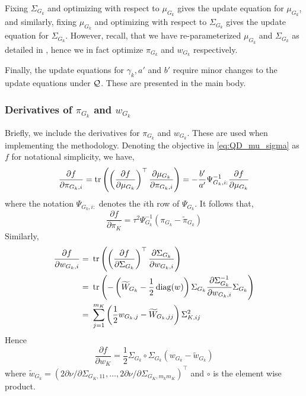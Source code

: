 Fixing $\Sigma_{G_k}$ and optimizing with respect to $\mu_{G_k}$ gives the update equation for $\mu_{G_k}$, and similarly, fixing $\mu_{G_k}$ and optimizing with respect to $\Sigma_{G_k}$ gives the update equation for $\Sigma_{G_k}$. However, recall, that we have re-parameterized $\mu_{G_k}$ and $\Sigma_{G_k}$ as detailed in , hence we in fact optimize $\pi_{G_k}$ and $w_{G_k}$ respectively.

Finally, the update equations for $\gamma_k, a'$ and $b'$ require minor changes to the update equations under $\mathcal{Q}$. These are presented in the main body.

\subsubsection{Derivatives of $\pi_{G_k}$ and $w_{G_k}$}

Briefly, we include the derivatives for $\pi_{G_k}$ and $w_{G_k}$. These are used when implementing the methodology. Denoting the objective in \eqref{eq:QD_mu_sigma} as $f$ for notational simplicity, we have,
\begin{equation*}
    \frac{\partial f}{\partial \pi_{G_k, i}} 
    = %
	\tr \left( 
	    \left( \frac{\partial f}{\partial \mu_{G_k}} \right)^\top 
	    \frac{\partial \mu_{G_k}}{\partial \pi_{G_k, i}} 
	\right)
    = 
	- \frac{b'}{a'}
	\Psi^{-1}_{G_k, i:} 
	\frac{\partial f}{\partial \mu_{G_k}}
\end{equation*}
where the notation $\Psi_{G_k, i:}$ denotes the $i$th row of $\Psi_{G_k}$. It follows that,
\begin{equation} \label{eq:QD_pi_grad} 
    \frac{\partial f}{\partial \pi_{K}} 
    = \tau^{2} \Psi_{G_k}^{-1} \left( \pi_{G_k} - \widetilde{\pi}_{G_k} \right)
\end{equation}
Similarly,
\begin{align*}
    \frac{\partial f}{\partial w_{G_k, i}} 
	=&\ 
	    \tr \left( 
		\left( \frac{\partial f}{\partial \Sigma_{G_k}} \right)^\top 
		\frac{\partial \Sigma_{G_k}}{\partial w_{G_k,i}} \right) \\
	=&\ \tr \left( - \left(\widetilde{W}_{G_k} - \frac{1}{2} \diag(w) \right) 
		\Sigma_{G_k}
		\frac{\partial \Sigma_{G_k}^{-1}}{\partial w_{G_k, i}} 
		\Sigma_{G_k}
	\right) \\
	=&\ 
	    \sum_{j=1}^{m_K} 
	    \left(\frac{1}{2}w_{G_k, j} - \widetilde{W}_{G_k, jj} \right) 
\Sigma_{K, ij}^2
\end{align*}
Hence
\begin{equation} \label{eq:QD_w_grad} 
    \frac{\partial f}{\partial w_{K}} = 
	\frac{1}{2} 
	\Sigma_{G_k} \circ \Sigma_{G_k} 
	\left(w_{G_k} - \widetilde{w}_{G_k} \right)
\end{equation}
where $\widetilde{w}_{G_k} = \left(2 \partial \nu / \partial \Sigma_{G_K, 11}, \dots, 2 \partial \nu / \partial \Sigma_{G_K, m_k m_K} \right)^\top$ and $\circ$ is the element wise product.


